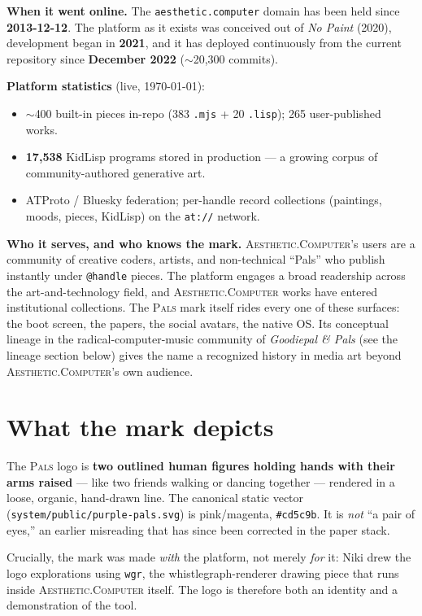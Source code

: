 \documentclass[10pt,letterpaper,twocolumn]{article}
\newcommand{\ac}{\textsc{Aesthetic}{\color{acpink}.}\textsc{Computer}}
\newcommand{\pals}{\textsc{Pals}}
\begin{document}
\textbf{When it went online.} The \texttt{aesthetic.computer} domain has
been held since \textbf{2013-12-12}. The platform as it exists was
conceived out of \emph{No Paint} (2020), development began in
\textbf{2021}, and it has deployed continuously from the current
repository since \textbf{December 2022} ($\sim$20{,}300 commits).

\textbf{Platform statistics} (live, \today):
\begin{itemize}
  \item $\sim$400 built-in pieces in-repo (383 \texttt{.mjs} + 20
        \texttt{.lisp}); 265 user-published works.
  \item \textbf{17{,}538} KidLisp programs stored in production --- a
        growing corpus of community-authored generative art.
  \item ATProto / Bluesky federation; per-handle record collections
        (paintings, moods, pieces, KidLisp) on the \texttt{at://} network.
\end{itemize}

\textbf{Who it serves, and who knows the mark.} \ac{}'s users are a
community of creative coders, artists, and non-technical ``Pals'' who
publish instantly under \texttt{@handle} pieces. The platform engages a
broad readership across the art-and-technology field, and \ac{} works have
entered institutional collections. The
\pals{} mark itself rides every one of these surfaces: the boot screen,
the papers, the social avatars, the native OS. Its conceptual lineage in
the radical-computer-music community of \emph{Goodiepal \& Pals} (see the
lineage section below) gives the name a recognized history in media art
beyond \ac{}'s own audience.

\section{What the mark depicts}

The \pals{} logo is \textbf{two outlined human figures holding hands with
their arms raised} --- like two friends walking or dancing together ---
rendered in a loose, organic, hand-drawn line. The canonical static
vector (\texttt{system/public/purple-pals.svg}) is pink/magenta,
\texttt{\#cd5c9b}. It is \emph{not} ``a pair of eyes,'' an earlier
misreading that has since been corrected in the paper stack.

Crucially, the mark was made \emph{with} the platform, not merely
\emph{for} it: Niki drew the logo explorations using \texttt{wgr}, the
whistlegraph-renderer drawing piece that runs inside \ac{} itself. The
logo is therefore both an identity and a demonstration of the tool.
\end{document}
